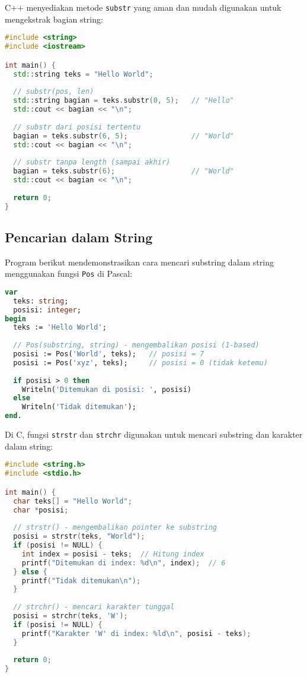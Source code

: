 \documentclass[../main.tex]{subfiles}
\begin{document}
C++ menyediakan metode \texttt{substr} yang aman dan mudah digunakan untuk mengekstrak bagian string:

\begin{lstlisting}[language=C++, caption={Substring di C++}]
#include <string>
#include <iostream>

int main() {
  std::string teks = "Hello World";
  
  // substr(pos, len)
  std::string bagian = teks.substr(0, 5);   // "Hello"
  std::cout << bagian << "\n";
  
  // substr dari posisi tertentu
  bagian = teks.substr(6, 5);               // "World"
  std::cout << bagian << "\n";
  
  // substr tanpa length (sampai akhir)
  bagian = teks.substr(6);                  // "World"
  std::cout << bagian << "\n";
  
  return 0;
}
\end{lstlisting}

\subsection{Pencarian dalam String}

Program berikut mendemonstrasikan cara mencari substring dalam string menggunakan fungsi \texttt{Pos} di Pascal:

\begin{lstlisting}[language=Pascal, caption={Pencarian di Pascal}]
var
  teks: string;
  posisi: integer;
begin
  teks := 'Hello World';
  
  // Pos(substring, string) - mengembalikan posisi (1-based)
  posisi := Pos('World', teks);   // posisi = 7
  posisi := Pos('xyz', teks);     // posisi = 0 (tidak ketemu)
  
  if posisi > 0 then
    Writeln('Ditemukan di posisi: ', posisi)
  else
    Writeln('Tidak ditemukan');
end.
\end{lstlisting}

Di C, fungsi \texttt{strstr} dan \texttt{strchr} digunakan untuk mencari substring dan karakter dalam string:

\begin{lstlisting}[language=C, caption={Pencarian di C}]
#include <string.h>
#include <stdio.h>

int main() {
  char teks[] = "Hello World";
  char *posisi;
  
  // strstr() - mengembalikan pointer ke substring
  posisi = strstr(teks, "World");
  if (posisi != NULL) {
    int index = posisi - teks;  // Hitung index
    printf("Ditemukan di index: %d\n", index);  // 6
  } else {
    printf("Tidak ditemukan\n");
  }
  
  // strchr() - mencari karakter tunggal
  posisi = strchr(teks, 'W');
  if (posisi != NULL) {
    printf("Karakter 'W' di index: %ld\n", posisi - teks);
  }
  
  return 0;
}
\end{lstlisting}
\end{document}
